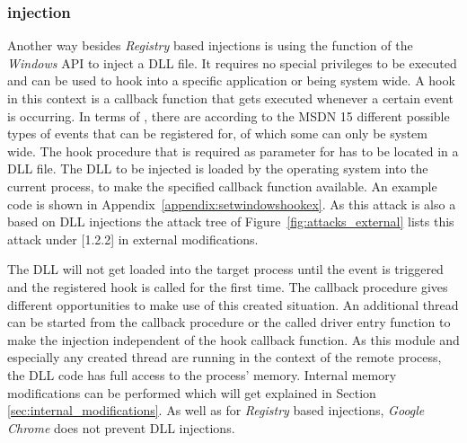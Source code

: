 \subsubsection{ injection}
Another way besides \emph{Registry} based injections is using the  function of the \emph{Windows} \gls{API} to inject a \gls{DLL} file. It requires no special privileges to be executed and can be used to  hook into a specific application or being system wide. A hook in this context is a callback function that gets executed whenever a certain event is occurring. In terms of , there are according to the \gls{MSDN} \cite{msdn_setwindowshookex} 15 different possible types of events that can be registered for, of which some can only be system wide. The hook procedure that is required as parameter for  has to be located in a \gls{DLL} file. The \gls{DLL} to be injected is loaded by the operating system into the current process, to make the specified callback function available. An example code is shown in Appendix~\ref{appendix:setwindowshookex}. As this attack is also a based on \gls{DLL} injections the attack tree of Figure~\ref{fig:attacks_external} lists this attack under [1.2.2] in external modifications. 

\medskip

The \gls{DLL} will not get loaded into the target process until the event is triggered and the registered hook is called for the first time. The callback procedure gives different opportunities to make use of this created situation. An additional thread can be started from the callback procedure or the called driver entry function to make the injection independent of the hook callback function. As this module and especially any created thread are running in the context of the remote process, the \gls{DLL} code has full access to the process' memory. Internal memory modifications can be performed which will get explained in Section \ref{sec:internal_modifications}. As well as for \emph{Registry} based injections, \emph{Google Chrome} does not prevent  \gls{DLL} injections.
